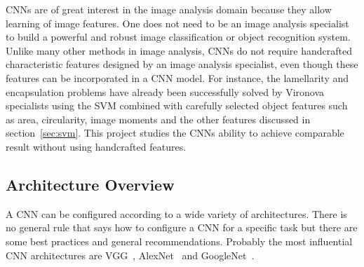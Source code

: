 \documentclass[a4paper, 11pt, table]{article}
\begin{document}
CNNs are of great interest in the image analysis domain because they allow learning of image features. One does not need to be an image analysis specialist to build a powerful and robust image classification or object recognition system. Unlike many other methods in image analysis, CNNs do not require handcrafted characteristic features designed by an image analysis specialist, even though these features can be incorporated in a CNN model. For instance, the lamellarity and encapsulation problems have already been successfully solved by Vironova specialists using the SVM combined with carefully selected object features such as area, circularity, image moments and the other features discussed in section~\ref{sec:svm}. This project studies the CNNs ability to achieve comparable result without using handcrafted features.

\subsection{Architecture Overview}

A CNN can be configured according to a wide variety of architectures. There is no general rule that says how to configure a CNN for a specific task but there are some best practices and general recommendations. Probably the most influential CNN architectures are VGG~\cite{DBLP:journals/corr/SimonyanZ14a}, AlexNet~\cite{NIPS2012_4824} and GoogleNet~\cite{DBLP:journals/corr/SzegedyLJSRAEVR14}.
\end{document}
